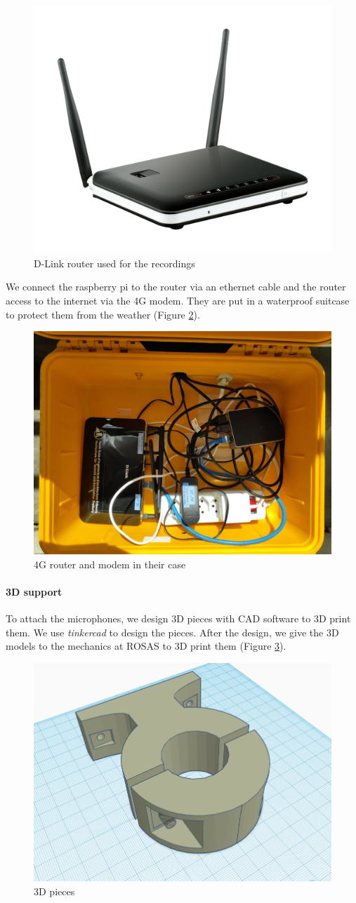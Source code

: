 \begin{figure}[H]
    \centering
    \includegraphics[width=.5\textwidth]{images/4g_lte_router.png}
    \caption{D-Link router used for the recordings}
    \label{fig:4g_lte_router}
\end{figure}

We connect the raspberry pi to the router via an ethernet cable and the router access to the internet via the 4G modem. They are put in a waterproof suitcase to protect them from the weather (Figure \ref{fig:embedded_system_installation}).

\begin{figure}[H]
    \centering
    \includegraphics[width=.5\textwidth]{images/embedded_system_installation.jpg}
    \caption{4G router and modem in their case}
    \label{fig:embedded_system_installation}
\end{figure}


\paragraph{3D support}

To attach the microphones, we design 3D pieces with CAD software to 3D print them. We use \textit{tinkercad} to design the pieces. After the design, we give the 3D models to the mechanics at ROSAS to 3D print them (Figure \ref{fig:3d_pieces}).

\begin{figure}[H]
    \centering
    \includegraphics[width=.5\textwidth]{../Images/tinkercad_mic_support.png}
    \caption{3D pieces}
    \label{fig:3d_pieces}
\end{figure}

